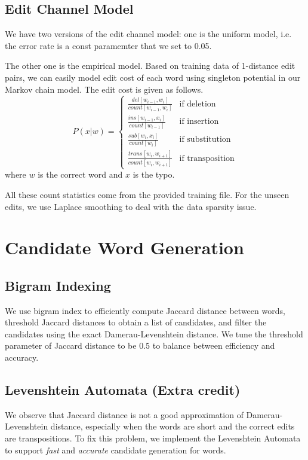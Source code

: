 \subsection{Edit Channel Model}
We have two versions of the edit channel model: one is the uniform model, i.e. the error rate is a const paramemter that we set to 0.05.

The other one is the empirical model. Based on training data of 1-distance edit pairs, we can easily model edit cost of each word using singleton potential in our Markov chain model. The edit cost is given as follows.
\begin{equation}\label{eq:5}
P(x | w) = \left\{\begin{array}{ll}
\frac{del[w_{i-1}, w_i]}{count[w_{i-1}, w_i]} & \textrm{if deletion} \\
\frac{ins[w_{i-1}, x_i]}{count[w_{i-1}]} & \textrm{if insertion} \\
\frac{sub[w_i, x_i]}{count[w_i]} & \textrm{if substitution} \\
\frac{trans[w_i, w_{i+1}]}{count[w_i, w_{i+1}]} & \textrm{if transposition}
\end{array}\right.
\end{equation}
where $w$ is the correct word and $x$ is the typo. 

All these count statistics come from the provided training file. For the unseen edits, we use Laplace smoothing to deal with the data sparsity issue.

\section{Candidate Word Generation}

\subsection{Bigram Indexing}
We use bigram index to efficiently compute Jaccard distance between words, threshold Jaccard distances to obtain a list of candidates, and filter the candidates using the exact Damerau-Levenshtein distance.
We tune the threshold parameter of Jaccard distance to be $0.5$ to balance between efficiency and accuracy. 

\subsection{Levenshtein Automata (Extra credit)}
We observe that Jaccard distance is not a good approximation of Damerau-Levenshtein distance, especially when the words are short and the correct edits are transpositions. To fix this problem, we implement the Levenshtein Automata to support \emph{fast} and \emph{accurate} candidate generation for words.

